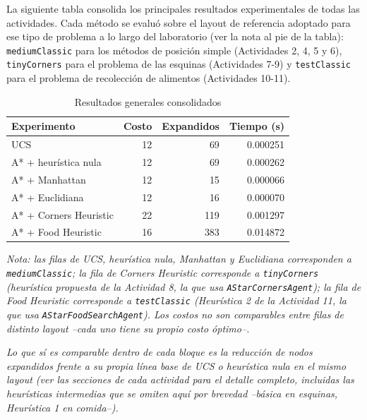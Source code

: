 La siguiente tabla consolida los principales resultados experimentales de todas las actividades.
Cada método se evaluó sobre el layout de referencia adoptado para ese tipo de problema a lo largo
del laboratorio (ver la nota al pie de la tabla): \texttt{mediumClassic} para los métodos de
posición simple (Actividades 2, 4, 5 y 6), \texttt{tinyCorners} para el problema de las esquinas
(Actividades 7-9) y \texttt{testClassic} para el problema de recolección de alimentos (Actividades
10-11).

\begin{table}[H]
\centering
\small
\caption{Resultados generales consolidados}
\label{tab:resultados-generales}
\begin{tabular}{lrrr}
\toprule
\textbf{Experimento} & \textbf{Costo} & \textbf{Expandidos} & \textbf{Tiempo (s)} \\
\midrule
UCS                          & 12 & 69  & 0.000251 \\
A* + heurística nula         & 12 & 69  & 0.000262 \\
A* + Manhattan                & 12 & 15  & 0.000066 \\
A* + Euclidiana                & 12 & 16  & 0.000070 \\
A* + Corners Heuristic         & 22 & 119 & 0.001297 \\
A* + Food Heuristic            & 16 & 383 & 0.014872 \\
\bottomrule
\end{tabular}
\end{table}

\textit{Nota: las filas de UCS, heurística nula, Manhattan y Euclidiana corresponden a
\texttt{mediumClassic}; la fila de Corners Heuristic corresponde a \texttt{tinyCorners} (heurística
propuesta de la Actividad 8, la que usa \texttt{AStarCornersAgent}); la fila de Food Heuristic
corresponde a \texttt{testClassic} (Heurística 2 de la Actividad 11, la que usa
\texttt{AStarFoodSearchAgent}). Los costos no son comparables entre filas de distinto layout --cada
uno tiene su propio costo óptimo--.}

\textit{Lo que sí es comparable dentro de cada bloque es la reducción de nodos expandidos frente a
su propia línea base de UCS o heurística nula en el mismo layout (ver las secciones de cada
actividad para el detalle completo, incluidas las heurísticas intermedias que se omiten aquí por
brevedad --básica en esquinas, Heurística 1 en comida--).}
